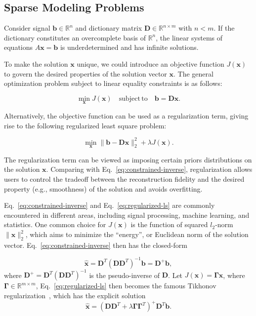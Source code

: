 \subsection{Sparse Modeling Problems}

Consider signal $\mathbf{b}\in\mathbb{R}^n$ and dictionary matrix
$\mathbf{D}\in\mathbb{R}^{n\times m}$ with $n<m$. If the dictionary constitutes an
overcomplete basis of $\mathbb{R}^n$, the linear systems of
equations $A\mathbf{x}=\mathbf{b}$ is underdetermined and has infinite solutions.

To make the solution $\mathbf{x}$ unique, we could introduce an objective function
$J(\mathbf{x})$ to govern the desired properties of the solution vector $\mathbf{x}$.
The general optimization problem subject to linear equality constraints is as follows:

\begin{equation}
\label{eq:constrained-inverse}
\min_\mathbf{x} J(\mathbf{x}) \quad \mathrm{subject\,to} \quad \mathbf{b}=\mathbf{D}\mathbf{x}.
\end{equation}

Alternatively, the objective function can be used as a regularization term, giving rise to
the following regularized least square problem:

\begin{equation}
\label{eq:regularized-ls}
\min_\mathbf{x} \|\mathbf{b}-\mathbf{D}\mathbf{x}\|_2^2 + \lambda J(\mathbf{x}).
\end{equation}

The regularization term can be viewed as imposing certain priors distributions on
the solution $\mathbf{x}$. Comparing with Eq.~\ref{eq:constrained-inverse}, regularization
allows users to control the tradeoff between the reconstruction fidelity and the
desired property (e.g., smoothness) of the solution and avoids overfitting.

Eq.~\ref{eq:constrained-inverse} and Eq.~\ref{eq:regularized-ls} are commonly encountered in different
areas, including signal processing, machine learning, and statistics. One common choice for $J(\mathbf{x})$
is the function of squared $l_2$-norm $\|\mathbf{x}\|_2^2$, which aims to minimize the ``energy'', or Euclidean
norm of the solution vector. Eq.~\ref{eq:constrained-inverse} then has the closed-form

\begin{equation}
\hat{\mathbf{x}}=\mathbf{D}^T(\mathbf{D}\mathbf{D}^T)^{-1}\mathbf{b}=\mathbf{D}^{+}\mathbf{b},
\end{equation}
where $\mathbf{D}^{+}=\mathbf{D}^T(\mathbf{D}\mathbf{D}^T)^{-1}$ is the pseudo-inverse
of $\mathbf{D}$. Let $J(\mathbf{x})=\mathbf{\Gamma}\mathbf{x}$, where $\mathbf{\Gamma}\in\mathbb{R}^{m\times m}$,
Eq.~\ref{eq:regularized-ls} then becomes the famous Tikhonov regularization~\cite{Golub1999}, which has the
explicit solution
\begin{equation}
\hat{\mathbf{x}} = (\mathbf{D}\mathbf{D}^T + \lambda \mathbf{\Gamma}\mathbf{\Gamma}^T)^{+}\mathbf{D}^T\mathbf{b}.
\end{equation}

